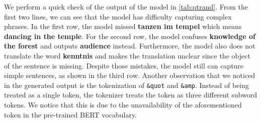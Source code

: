 We perform a quick check of the output of the model in \cref{tab:qtrand}. From the first two lines, we can see that the model has difficulty capturing complex phrases. In the first row, the model missed \textbf{tanzen im tempel} which means \textbf{dancing in the temple}. For the second row, the model confuses \textbf{knowledge of the forest} and outputs \textbf{audience} instead. Furthermore, the model also does not translate the word \textbf{kenntnis} and makes the translation unclear since the object of the sentence is missing. Despite those mistakes, the model still can capture simple sentences, as shown in the third row. Another observation that we noticed in the generated output is the tokenization of \texttt{\&quot\;} and \texttt{\&amp\;}. Instead of being treated as a single token, the tokenizer treats the token as three different subword tokens. We notice that this is due to the unavailability of the aforementioned token in the pre-trained BERT vocabulary.

